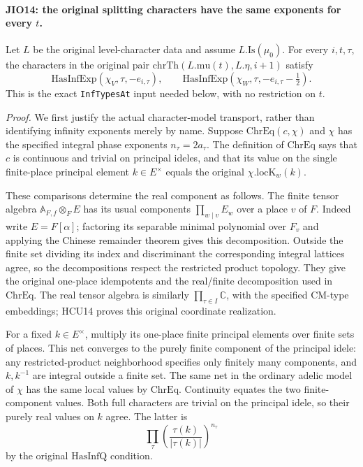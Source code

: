 \paragraph{JIO14: the original splitting characters have the same exponents for every \(t\).}
\label{claim:JIO14}
Let \(L\) be the original level-character data and assume
\(L.\mathrm{Is}(\mu_0)\).  For every \(i,t,\tau\), the characters
in the original pair
\(\mathrm{chrTh}(L.\mathrm{mu}(t),L.\eta,i+1)\) satisfy
\[
 \mathrm{HasInfExp}(\chi_V,\tau,-e_{i,\tau}),\qquad
 \mathrm{HasInfExp}(\chi_W,\tau,-e_{i,\tau}-\tfrac12).
 \tag{JIO.42}
\]
This is the exact \texttt{InfTypesAt} input needed below,
with no restriction on \(t\).

\emph{Proof.}
We first justify the actual character-model transport, rather
than identifying infinity exponents merely by name.
Suppose \(\mathrm{ChrEq}(c,\chi)\) and \(\chi\) has the
specified integral phase exponents \(n_\tau=2a_\tau\).
The definition of \(\mathrm{ChrEq}\) says that \(c\) is continuous
and trivial on principal ideles, and that its value on the
single finite-place principal element \(k\in E^\times\)
equals the original \(\chi.\mathrm{locK}_w(k)\).

These comparisons determine the real component as follows.
The finite tensor algebra
\(\mathbb A_{F,f}\otimes_F E\) has its usual components
\(\prod_{w\mid v}E_w\) over a place \(v\) of \(F\).
Indeed write \(E=F[\alpha]\); factoring its separable minimal
polynomial over \(F_v\) and applying the Chinese remainder
theorem gives this decomposition.  Outside the finite set
dividing its index and discriminant the corresponding integral
lattices agree, so the decompositions respect the restricted
product topology.  They give the original one-place idempotents
and the real/finite decomposition used in \(\mathrm{ChrEq}\).
The real tensor algebra is similarly
\(\prod_{\tau\in I}\mathbb C\), with the specified CM-type
embeddings; HCU14 proves this original coordinate realization.

For a fixed \(k\in E^\times\), multiply its one-place finite
principal elements over finite sets of places.  This net
converges to the purely finite component of the principal
idele: any restricted-product neighborhood specifies only
finitely many components, and \(k,k^{-1}\) are integral outside
a finite set.  The same net in the ordinary adelic model of
\(\chi\) has the same local values by \(\mathrm{ChrEq}\).
Continuity equates the two finite-component values.
Both full characters are trivial on the principal idele, so
their purely real values on \(k\) agree.  The latter is
\[
           \prod_\tau
              \left(\frac{\tau(k)}{|\tau(k)|}\right)^{n_\tau}
 \tag{JIO.43}
\]
by the original \(\mathrm{HasInfQ}\) condition.

